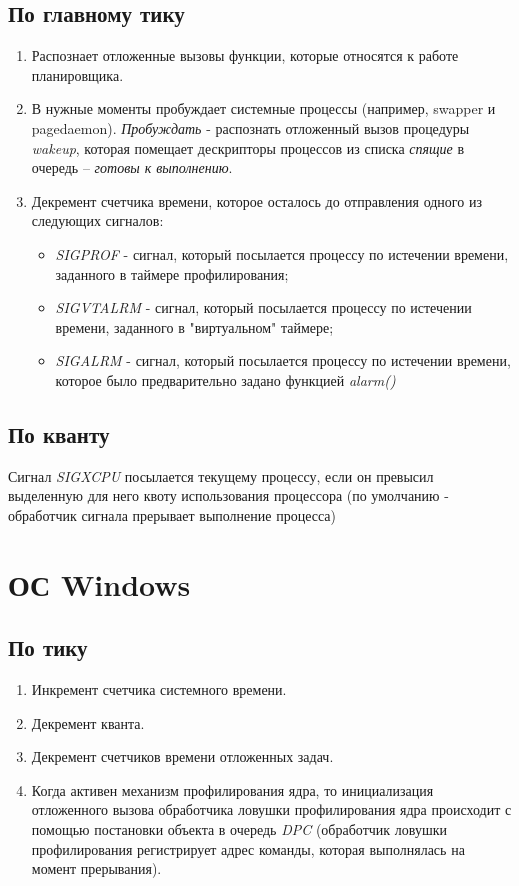 \subsection{По главному тику}
\begin{enumerate}
    \item Распознает отложенные вызовы функции, которые относятся к работе планировщика.
    \item В нужные моменты пробуждает системные процессы (например, swapper и pagedaemon). \textit{Пробуждать} - распознать отложенный вызов процедуры \textit{wakeup}, которая помещает дескрипторы процессов из списка \textit{спящие} в очередь -- \textit{готовы к выполнению}.
    \item Декремент счетчика времени, которое осталось до отправления одного из следующих сигналов:

    \begin{itemize}
        \item \textit{SIGPROF} - сигнал, который посылается процессу по истечении времени, заданного в таймере профилирования;
        \item \textit{SIGVTALRM} - сигнал, который посылается процессу по истечении времени, заданного в "виртуальном" таймере;
        \item \textit{SIGALRM} - сигнал, который посылается процессу по истечении времени, которое было предварительно задано функцией \textit{alarm()}
    \end{itemize}

\end{enumerate}


\subsection{По кванту}

Сигнал \textit{SIGXCPU} посылается текущему процессу, если он превысил выделенную для него квоту использования процессора (по умолчанию - обработчик сигнала прерывает выполнение процесса)



\section{ОС Windows}
\subsection{По тику}
\begin{enumerate}
    \item Инкремент счетчика системного времени.
    \item Декремент кванта.
    \item Декремент счетчиков времени отложенных задач.
    \item Когда активен механизм профилирования ядра, то инициализация отложенного вызова обработчика ловушки профилирования ядра происходит с помощью постановки объекта в очередь \textit{DPC} (обработчик ловушки профилирования регистрирует адрес команды, которая выполнялась на момент прерывания).
\end{enumerate}



